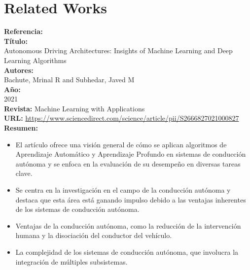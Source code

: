 \documentclass[10pt,letterpaper,final]{article}
\begin{document}
    \section*{Related Works}
    \newline
    \begin{longtable}
        \hline
        \noindent \textbf{Referencia:}~\cite{bachute2021autonomous}                                    \\
        \textbf{Título:}                                                                               \\
        Autonomous Driving Architectures: Insights of Machine Learning and Deep Learning Algorithms \\
        \textbf{Autores:}                                                                              \\
        Bachute, Mrinal R and Subhedar, Javed M                                                        \\
        \textbf{Año:}                                                                                  \\
        2021                                                                                           \\
        \textbf{Revista:}
        Machine Learning with Applications                                                             \\
        \textbf{URL:}
        \url{https://www.sciencedirect.com/science/article/pii/S2666827021000827}                      \\
        \textbf{Resumen:}
        \begin{itemize}
            \item El artículo ofrece una visión general de cómo se aplican algoritmos de Aprendizaje Automático y Aprendizaje
            Profundo en sistemas de conducción autónoma y se enfoca en la evaluación de su desempeño en diversas tareas clave.
            \item Se centra en la investigación en el campo de la conducción autónoma y destaca que esta área está ganando
            impulso debido a las ventajas inherentes de los sistemas de conducción autónoma.
            \item Ventajas de la conducción autónoma, como la reducción de la intervención humana y la disociación del conductor del vehículo.
            \item La complejidad de los sistemas de conducción autónoma, que involucra la integración de múltiples subsistemas.

\end{itemize}
\end{longtable}
\end{document}
